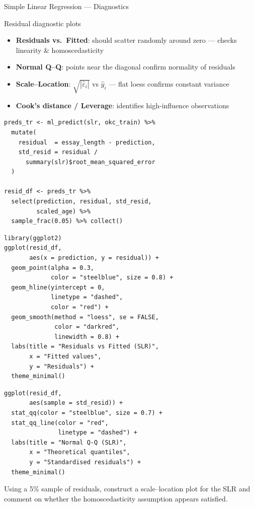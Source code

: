 \documentclass[11pt, aspectratio=169]{beamer}
\begin{document}
\begin{frame}{Simple Linear Regression --- Diagnostics}
	\begin{block}{Residual diagnostic plots}
				\begin{itemize}
					\item \textbf{Residuals vs.\ Fitted}: should scatter randomly
					around zero --- checks linearity \& homoscedasticity
					\item \textbf{Normal Q--Q}: points near the diagonal confirm
					normality of residuals
					\item \textbf{Scale--Location}: $\sqrt{|\hat\varepsilon_i|}$ vs $\hat y_i$
					--- flat loess confirms constant variance
					\item \textbf{Cook's distance / Leverage}: identifies high-influence
					observations
				\end{itemize}
			\end{block}
			\begin{lstlisting}[title={Extract residuals in sparklyr}]
preds_tr <- ml_predict(slr, okc_train) %>%
  mutate(
    residual  = essay_length - prediction,
    std_resid = residual /
      summary(slr)$root_mean_squared_error
  )

resid_df <- preds_tr %>%
  select(prediction, residual, std_resid,
         scaled_age) %>%
  sample_frac(0.05) %>% collect()
			\end{lstlisting}
		\begin{lstlisting}[title={Residuals vs Fitted}]
library(ggplot2)
ggplot(resid_df,
       aes(x = prediction, y = residual)) +
  geom_point(alpha = 0.3,
             color = "steelblue", size = 0.8) +
  geom_hline(yintercept = 0,
             linetype = "dashed",
             color = "red") +
  geom_smooth(method = "loess", se = FALSE,
              color = "darkred",
              linewidth = 0.8) +
  labs(title = "Residuals vs Fitted (SLR)",
       x = "Fitted values",
       y = "Residuals") +
  theme_minimal()
			\end{lstlisting}
			\begin{lstlisting}[title={Normal Q--Q plot}]
ggplot(resid_df,
       aes(sample = std_resid)) +
  stat_qq(color = "steelblue", size = 0.7) +
  stat_qq_line(color = "red",
               linetype = "dashed") +
  labs(title = "Normal Q-Q (SLR)",
       x = "Theoretical quantiles",
       y = "Standardised residuals") +
  theme_minimal()
			\end{lstlisting}
			\begin{exercise}[Exercise]
				Using a 5\% sample of residuals, construct a scale--location
				plot for the SLR and comment on whether the homoscedasticity
				assumption appears satisfied.
			\end{exercise}
		\end{frame}
\end{document}

